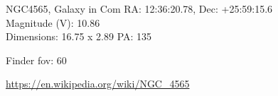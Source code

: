 \begin{block}{NGC4565, Galaxy in Com}
    RA: 12:36:20.78, Dec: +25:59:15.6 \\ 
    Magnitude (V): 10.86 \\ 
    Dimensions: 16.75 x 2.89 PA: 135 

    Finder fov: 60 

    \url{https://en.wikipedia.org/wiki/NGC_4565} 
\end{block}